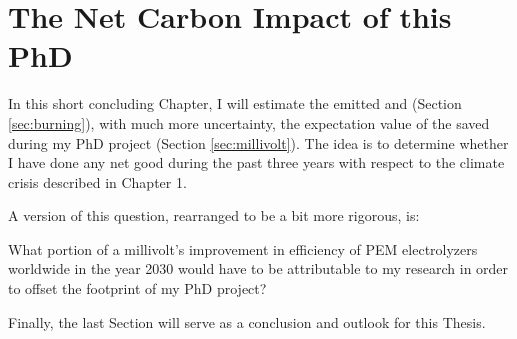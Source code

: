 

\chapter{The Net Carbon Impact of this PhD}\label{ch:impact}

In this short concluding Chapter, I will estimate the  emitted and (Section \ref{sec:burning}), with much more uncertainty, the expectation value of the  saved during my PhD project (Section \ref{sec:millivolt}). The idea is to determine whether I have done any net good during the past three years with respect to the climate crisis described in Chapter 1.

A version of this question, rearranged to be a bit more rigorous, is:
\begin{question}
	What portion of a millivolt's improvement in efficiency of PEM electrolyzers worldwide in the year 2030 would have to be attributable to my research in order to offset the  footprint of my PhD project? \label{q:impact}
\end{question}

Finally, the last Section will serve as a conclusion and outlook for this Thesis.




\label{sec:millivolt}


\label{sec:conclusion}